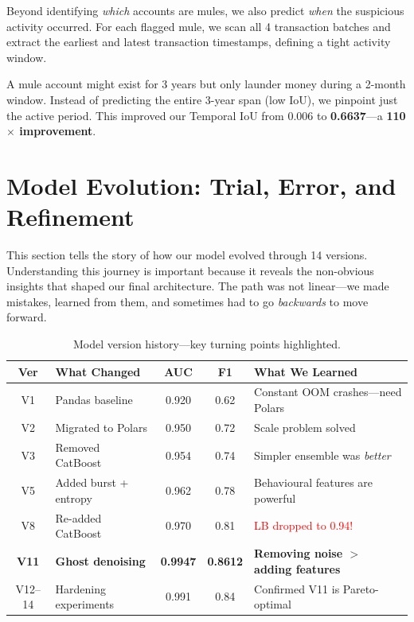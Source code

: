 \documentclass[11pt, a4paper]{article}
\begin{document}
Beyond identifying \emph{which} accounts are mules, we also predict \emph{when} the
suspicious activity occurred. For each flagged mule, we scan all 4 transaction batches and
extract the earliest and latest transaction timestamps, defining a tight activity window.

\begin{insightbox}
A mule account might exist for 3 years but only launder money during a 2-month window.
Instead of predicting the entire 3-year span (low IoU), we pinpoint just the active
period. This improved our Temporal IoU from 0.006 to \textbf{0.6637}---a
\textbf{110$\times$ improvement}.
\end{insightbox}


\section{Model Evolution: Trial, Error, and Refinement}

This section tells the story of how our model evolved through 14 versions. Understanding
this journey is important because it reveals the non-obvious insights that shaped our final
architecture. The path was not linear---we made mistakes, learned from them, and sometimes
had to go \emph{backwards} to move forward.

\begin{table}[H]
\centering\small
\caption{Model version history---key turning points highlighted.}
\begin{tabular}{@{}clccp{5cm}@{}}
\toprule
\textbf{Ver} & \textbf{What Changed} & \textbf{AUC} & \textbf{F1} & \textbf{What We Learned} \\
\midrule
V1  & Pandas baseline            & 0.920 & 0.62 & Constant OOM crashes---need Polars \\
V2  & Migrated to Polars         & 0.950 & 0.72 & Scale problem solved \\
V3  & Removed CatBoost           & 0.954 & 0.74 & Simpler ensemble was \emph{better} \\
V5  & Added burst + entropy      & 0.962 & 0.78 & Behavioural features are powerful \\
V8  & Re-added CatBoost          & 0.970 & 0.81 & \textcolor{red}{LB dropped to 0.94!} \\
\rowcolor{green!8}
\textbf{V11} & \textbf{Ghost denoising}  & \textbf{0.9947} & \textbf{0.8612} &
    \textbf{Removing noise $>$ adding features} \\
V12--14 & Hardening experiments    & 0.991 & 0.84 & Confirmed V11 is Pareto-optimal \\
\bottomrule
\end{tabular}
\end{table}
\end{document}
